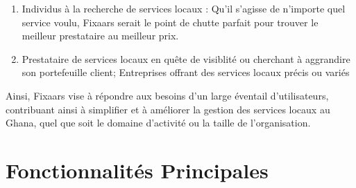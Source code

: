 \begin{enumerate}

    \item Individus à la recherche de services locaux : Qu'il s'agisse de n'importe quel service voulu, Fixaars serait le point de chutte parfait pour trouver le meilleur prestataire au meilleur prix.

    \item Prestataire de services locaux en quête de visiblité ou cherchant à aggrandire son portefeuille client; Entreprises offrant des services locaux précis ou variés 
    
\end{enumerate}

Ainsi, Fixaars vise à répondre aux besoins d'un large éventail d'utilisateurs, contribuant ainsi à simplifier et à améliorer la gestion des services locaux au Ghana, quel que soit le domaine d'activité ou la taille de l'organisation.

\section{Fonctionnalités Principales}

